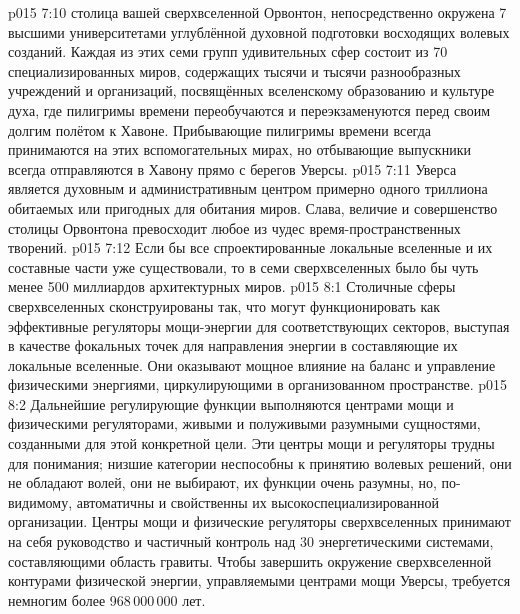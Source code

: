 \vs p015 7:10 \pc {} столица вашей сверхвселенной Орвонтон, непосредственно окружена 7 высшими университетами углублённой духовной подготовки восходящих волевых созданий. Каждая из этих семи групп удивительных сфер состоит из 70 специализированных миров, содержащих тысячи и тысячи разнообразных учреждений и организаций, посвящённых вселенскому образованию и культуре духа, где пилигримы времени переобучаются и переэкзаменуются перед своим долгим полётом к Хавоне. Прибывающие пилигримы времени всегда принимаются на этих вспомогательных мирах, но отбывающие выпускники всегда отправляются в Хавону прямо с берегов Уверсы.
\vs p015 7:11 Уверса является духовным и административным центром примерно одного триллиона обитаемых или пригодных для обитания миров. Слава, величие и совершенство столицы Орвонтона превосходит любое из чудес время\hyp{}пространственных творений.
\vs p015 7:12 \pc Если бы все спроектированные локальные вселенные и их составные части уже существовали, то в семи сверхвселенных было бы чуть менее 500 миллиардов архитектурных миров.
\vs p015 8:1 Столичные сферы сверхвселенных сконструированы так, что могут функционировать как эффективные регуляторы мощи\hyp{}энергии для соответствующих секторов, выступая в качестве фокальных точек для направления энергии в составляющие их локальные вселенные. Они оказывают мощное влияние на баланс и управление физическими энергиями, циркулирующими в организованном пространстве.
\vs p015 8:2 Дальнейшие регулирующие функции выполняются центрами мощи и физическими регуляторами, живыми и полуживыми разумными сущностями, созданными для этой конкретной цели. Эти центры мощи и регуляторы трудны для понимания; низшие категории неспособны к принятию волевых решений, они не обладают волей, они не выбирают, их функции очень разумны, но, по\hyp{}видимому, автоматичны и свойственны их высокоспециализированной организации. Центры мощи и физические регуляторы сверхвселенных принимают на себя руководство и частичный контроль над 30 энергетическими системами, составляющими область гравиты. Чтобы завершить окружение сверхвселенной контурами физической энергии, управляемыми центрами мощи Уверсы, требуется немногим более 968\,000\,000 лет.
